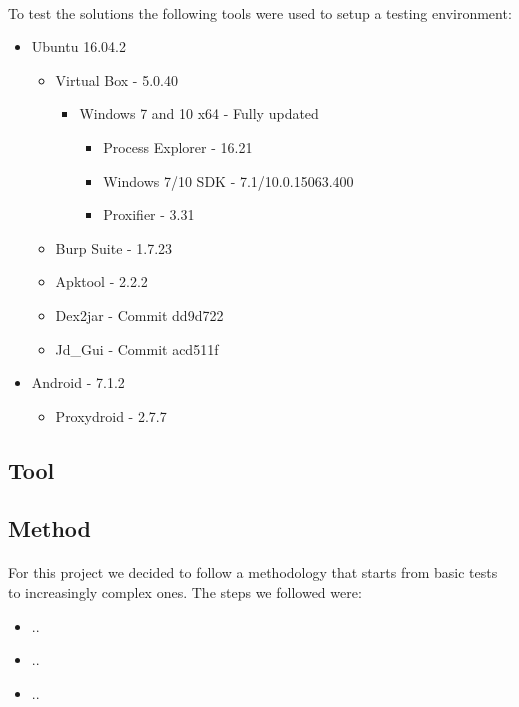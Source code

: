 \paragraph{}
To test the solutions the following tools were used to setup a testing environment:
\begin{itemize}
    \item Ubuntu 16.04.2
    \begin{itemize}
        \item Virtual Box - 5.0.40
        \begin{itemize}
            \item Windows 7 and 10 x64 - Fully updated
            \begin{itemize}
                \item Process Explorer - 16.21
                \item Windows 7/10 SDK - 7.1/10.0.15063.400
                \item Proxifier - 3.31
            \end{itemize}
        \end{itemize}
        \item Burp Suite - 1.7.23
        \item Apktool - 2.2.2
        \item Dex2jar - Commit dd9d722
        \item Jd\_Gui - Commit acd511f
    \end{itemize}
    \item Android - 7.1.2
    \begin{itemize}
        \item Proxydroid - 2.7.7
    \end{itemize}
\end{itemize}

\subsection{Tool}



\clearpage
\subsection{Method}
\paragraph{}
For this project we decided to follow a methodology that starts from basic tests to increasingly complex ones. The steps we followed were:
\begin{itemize}
    \item ..
    \item ..
    \item ..
\end{itemize}
